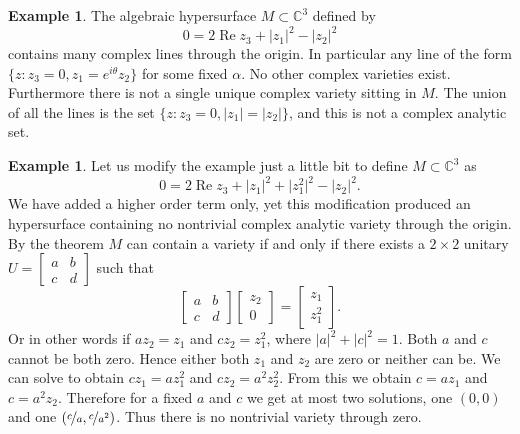\documentclass[12pt,openany]{book}
\renewcommand{\Re}{\operatorname{Re}}
\newcommand{\sabs}[1]{\lvert {#1} \rvert}
\newcommand{\abs}[1]{\left\lvert {#1} \right\rvert}
\newcommand{\C}{{\mathbb{C}}}
\theoremstyle{plain}
\theoremstyle{remark}
\theoremstyle{definition}
\theoremstyle{exercise}
\theoremstyle{example}
\newtheorem{example}[thm]{Example}
\begin{document}
\begin{example}
The algebraic hypersurface $M \subset \C^3$ defined by
\begin{equation}
0= 2 \Re z_3 + \abs{z_1}^2 - \abs{z_2}^2
\end{equation}
contains many complex lines through the origin.  In particular any line of the
form $\{ z : z_3 = 0, z_1 = e^{i\theta} z_2 \}$ for some fixed $\alpha$.
No other complex varieties exist.  Furthermore there is not
a single unique complex variety sitting in $M$.  The union of all the lines
is the set
$\{ z : z_3 = 0, \abs{z_1} = \abs{z_2} \}$, and this is not a complex
analytic set.
\end{example}

\begin{example}
Let us modify the example just a little bit to define $M \subset \C^3$ as
\begin{equation}
0=2 \Re z_3 + \sabs{z_1}^2 + \sabs{z_1^2}^2 - \sabs{z_2}^2 .
\end{equation}
We have added a higher order term only, yet this modification produced an
hypersurface containing no nontrivial complex analytic variety through the
origin.
By the theorem $M$ can contain a variety if and only if there exists a $2
\times 2$ unitary $U =
\left[ \begin{smallmatrix} a & b \\ c & d \end{smallmatrix} \right]$ such that
\begin{equation}
\begin{bmatrix} a & b \\ c & d \end{bmatrix}
\begin{bmatrix} z_2 \\ 0 \end{bmatrix} =
\begin{bmatrix} z_1 \\ z_1^2 \end{bmatrix} .
\end{equation}
Or in other words if $a z_2 = z_1$ and $c z_2 = z_1^2$, where $\abs{a}^2 +
\abs{c}^2 = 1$.  Both $a$ and $c$ cannot be both zero.
Hence either both
$z_1$ and $z_2$ are zero or neither can be.
We can solve
to obtain $c z_1 = a z_1^2$ and $c z_2 = a^2 z_2^2$.  From this we obtain
$c = a z_1$ and $c = a^2 z_2$.  Therefore for a fixed $a$ and $c$ we get
at most two solutions, one $(0,0)$ and one $(\nicefrac{c}{a},
\nicefrac{c}{a^2})$.  Thus there is no nontrivial variety through zero.
\end{example}
\end{document}
